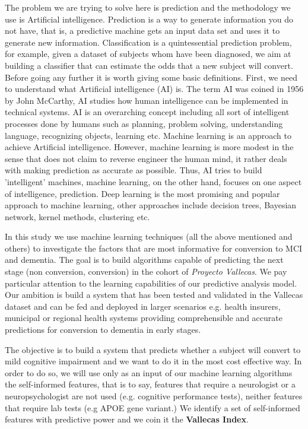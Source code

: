 \documentclass[11pt]{article}
\theoremstyle{definition}
\theoremstyle{remark}
\begin{document}
The problem we are trying to solve here is prediction and the methodology we use is Artificial intelligence. Prediction is a way to generate information you do not have, that is, a predictive machine gets an input data set and uses it to generate new information. Classification is a quintessential prediction problem, for example, given a dataset of subjects whom have been diagnosed, we aim at building a classifier that can estimate the odds that a new subject will convert. Before going any further it is worth giving some basic definitions. First, we need to understand what Artificial intelligence (AI) is. The term AI was coined in 1956 by John McCarthy, AI studies how human intelligence can be implemented in technical systems. AI is an overarching concept including all sort of intelligent processes done by humans such as planning, problem solving, understanding language, recognizing objects, learning etc. 
Machine learning is an approach to achieve Artificial intelligence. However, machine learning is more modest in the sense that does not claim to reverse engineer the human mind, it rather deals with making prediction as accurate as possible. Thus, AI tries to build 'intelligent' machines, machine learning, on the other hand, focuses on one aspect of intelligence, prediction.
Deep learning is the most promising and popular approach to machine learning, other approaches include decision trees, Bayesian network, kernel methods, clustering etc.
  
In this study we use machine learning techniques (all the above mentioned and others) to investigate the factors that are most informative for conversion to MCI and dementia. The goal is to build algorithms capable of predicting the next stage (non conversion, conversion) in the cohort of \emph{Proyecto Vallecas}. We pay particular attention to the learning capabilities of our predictive analysis model. Our ambition is build a system that has been tested and validated in the Vallecas dataset and can be fed and deployed in larger scenarios e.g. health insurers, municipal or regional health systems providing comprehensible and accurate predictions for conversion to dementia in early stages.

The objective is to build a system that predicts whether a subject will convert to mild cognitive impairment and we want to do it in the most cost effective way. In order to do so, we will use only as an input of our machine learning algorithms the self-informed features, that is to say, features that require a neurologist or a neuropsychologist are not used (e.g. cognitive performance tests), neither features that require lab tests (e.g APOE gene variant.)
We identify a set of self-informed features with predictive power and we coin it the \textbf{Vallecas Index}. 
\end{document}
